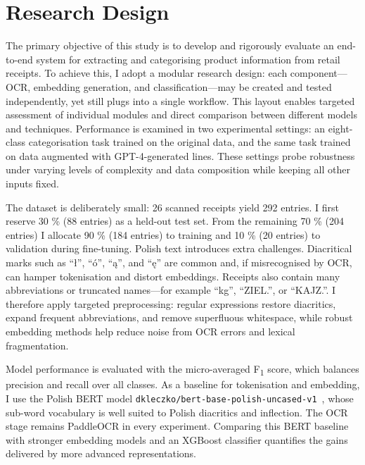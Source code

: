 \documentclass{SGGW-thesis-EN}
\begin{document}
\section{Research Design}
The primary objective of this study is to develop and rigorously evaluate an end-to-end system for extracting and
categorising product information from retail receipts.  To achieve this, I adopt a modular research design: each
component—OCR, embedding generation, and classification—may be created and tested independently, yet still plugs into a
single workflow.  This layout enables targeted assessment of individual modules and direct comparison between different
models and techniques.  Performance is examined in two experimental settings: an eight-class categorisation task trained
on the original data, and the same task trained on data augmented with GPT-4-generated lines.
These settings probe robustness under varying levels of complexity and data composition while keeping all other inputs
fixed.

The dataset is deliberately small: 26 scanned receipts yield 292 entries.  I first reserve 30 \% (88 entries)
as a held-out test set.  From the remaining 70 \% (204 entries) I allocate 90 \% (184 entries) to training and 10 \%
(20 entries) to validation during fine-tuning.
Polish text introduces extra challenges.  Diacritical marks such as “ł”, “ó”, “ą”, and “ę” are common and, if
misrecognised by OCR, can hamper tokenisation and distort embeddings.  Receipts also contain many abbreviations or
truncated names—for example “kg”, “ZIEL.”, or “KAJZ.”.  I therefore apply targeted preprocessing: regular expressions
restore diacritics, expand frequent abbreviations, and remove superfluous whitespace, while robust embedding methods
help reduce noise from OCR errors and lexical fragmentation.

Model performance is evaluated with the micro-averaged F\textsubscript{1} score, which balances precision and recall
over all classes.  As a baseline for tokenisation and embedding, I use the Polish BERT model
\texttt{dkleczko/bert-base-polish-uncased-v1}~\cite{kleczek2020polbert},
whose sub-word vocabulary is well suited to Polish diacritics and inflection.  The OCR stage remains PaddleOCR in every
experiment. Comparing this BERT baseline with stronger embedding models and an XGBoost classifier quantifies the gains delivered by more advanced
representations.
\end{document}
